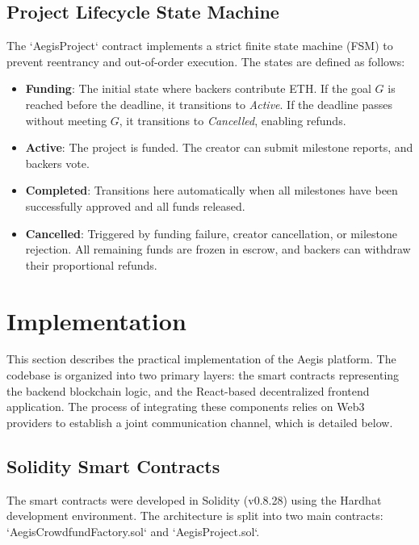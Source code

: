 \documentclass[conference]{IEEEtran}
\begin{document}
\subsection{Project Lifecycle State Machine}
The `AegisProject` contract implements a strict finite state machine (FSM) to prevent reentrancy and out-of-order execution. The states are defined as follows:
\begin{itemize}
	\item \textbf{Funding}: The initial state where backers contribute ETH. If the goal $G$ is reached before the deadline, it transitions to \textit{Active}. If the deadline passes without meeting $G$, it transitions to \textit{Cancelled}, enabling refunds.
	\item \textbf{Active}: The project is funded. The creator can submit milestone reports, and backers vote.
	\item \textbf{Completed}: Transitions here automatically when all milestones have been successfully approved and all funds released.
	\item \textbf{Cancelled}: Triggered by funding failure, creator cancellation, or milestone rejection. All remaining funds are frozen in escrow, and backers can withdraw their proportional refunds.
\end{itemize}

\section{Implementation}
This section describes the practical implementation of the Aegis platform. The codebase is organized into two primary layers: the smart contracts representing the backend blockchain logic, and the React-based decentralized frontend application. The process of integrating these components relies on Web3 providers to establish a joint communication channel, which is detailed below.

\subsection{Solidity Smart Contracts}
The smart contracts were developed in Solidity (v0.8.28) using the Hardhat development environment. The architecture is split into two main contracts: `AegisCrowdfundFactory.sol` and `AegisProject.sol`.
\end{document}
